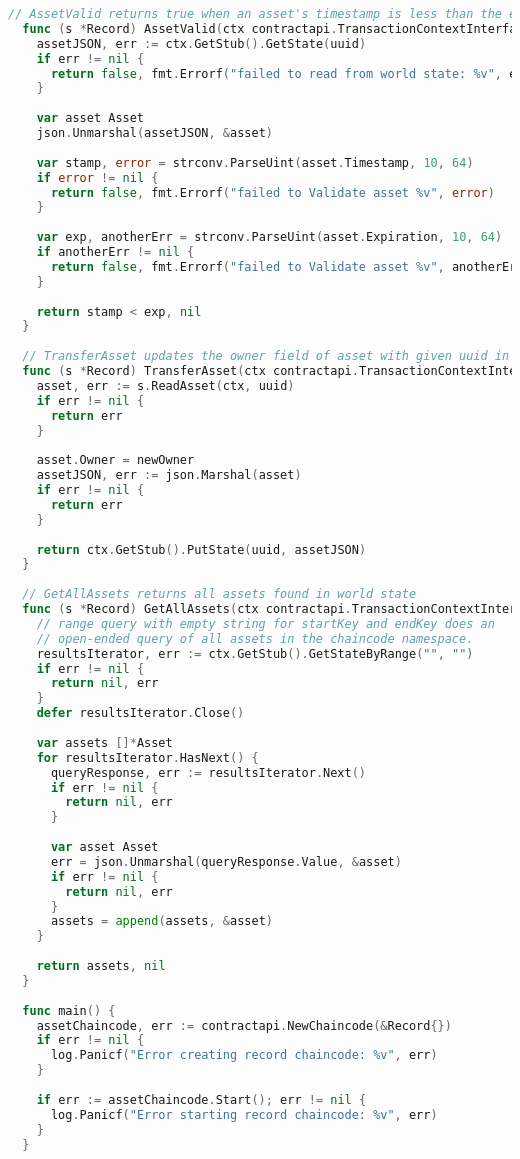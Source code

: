 \begin{lstlisting}[language=Go, caption={Chaincode representing immunisation records.}]
  // AssetValid returns true when an asset's timestamp is less than the expiration
  func (s *Record) AssetValid(ctx contractapi.TransactionContextInterface, uuid string) (bool, error) {
    assetJSON, err := ctx.GetStub().GetState(uuid)
    if err != nil {
      return false, fmt.Errorf("failed to read from world state: %v", err)
    }
  
    var asset Asset
    json.Unmarshal(assetJSON, &asset)
  
    var stamp, error = strconv.ParseUint(asset.Timestamp, 10, 64)
    if error != nil {
      return false, fmt.Errorf("failed to Validate asset %v", error)
    }
  
    var exp, anotherErr = strconv.ParseUint(asset.Expiration, 10, 64)
    if anotherErr != nil {
      return false, fmt.Errorf("failed to Validate asset %v", anotherErr)
    }
  
    return stamp < exp, nil
  }
  
  // TransferAsset updates the owner field of asset with given uuid in world state.
  func (s *Record) TransferAsset(ctx contractapi.TransactionContextInterface, uuid string, newOwner string) error {
    asset, err := s.ReadAsset(ctx, uuid)
    if err != nil {
      return err
    }
  
    asset.Owner = newOwner
    assetJSON, err := json.Marshal(asset)
    if err != nil {
      return err
    }
  
    return ctx.GetStub().PutState(uuid, assetJSON)
  }
  
  // GetAllAssets returns all assets found in world state
  func (s *Record) GetAllAssets(ctx contractapi.TransactionContextInterface) ([]*Asset, error) {
    // range query with empty string for startKey and endKey does an
    // open-ended query of all assets in the chaincode namespace.
    resultsIterator, err := ctx.GetStub().GetStateByRange("", "")
    if err != nil {
      return nil, err
    }
    defer resultsIterator.Close()
  
    var assets []*Asset
    for resultsIterator.HasNext() {
      queryResponse, err := resultsIterator.Next()
      if err != nil {
        return nil, err
      }
  
      var asset Asset
      err = json.Unmarshal(queryResponse.Value, &asset)
      if err != nil {
        return nil, err
      }
      assets = append(assets, &asset)
    }
  
    return assets, nil
  }
  
  func main() {
    assetChaincode, err := contractapi.NewChaincode(&Record{})
    if err != nil {
      log.Panicf("Error creating record chaincode: %v", err)
    }
  
    if err := assetChaincode.Start(); err != nil {
      log.Panicf("Error starting record chaincode: %v", err)
    }
  }
  
\end{lstlisting}

